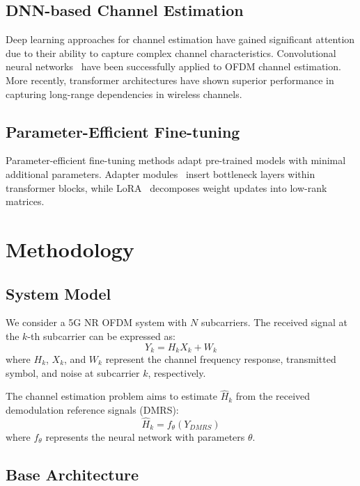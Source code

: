 \documentclass[conference]{IEEEtran}
\begin{document}
\subsection{DNN-based Channel Estimation}
Deep learning approaches for channel estimation have gained significant attention due to their ability to capture complex channel characteristics. Convolutional neural networks~\cite{ye2018power} have been successfully applied to OFDM channel estimation. More recently, transformer architectures have shown superior performance in capturing long-range dependencies in wireless channels.

\subsection{Parameter-Efficient Fine-tuning}
Parameter-efficient fine-tuning methods adapt pre-trained models with minimal additional parameters. Adapter modules~\cite{houlsby2019parameter} insert bottleneck layers within transformer blocks, while LoRA~\cite{hu2021lora} decomposes weight updates into low-rank matrices.

\section{Methodology}

\subsection{System Model}

We consider a 5G NR OFDM system with $N$ subcarriers. The received signal at the $k$-th subcarrier can be expressed as:
\begin{equation}
Y_k = H_k X_k + W_k
\end{equation}
where $H_k$, $X_k$, and $W_k$ represent the channel frequency response, transmitted symbol, and noise at subcarrier $k$, respectively.

The channel estimation problem aims to estimate $\hat{H}_k$ from the received demodulation reference signals (DMRS):
\begin{equation}
\hat{H}_k = f_{\theta}(Y_{DMRS})
\end{equation}
where $f_{\theta}$ represents the neural network with parameters $\theta$.

\subsection{Base Architecture}
\end{document}
